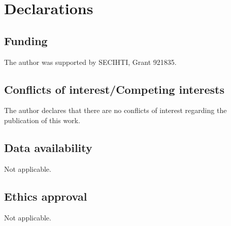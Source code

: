 \documentclass[preprint,12pt]{elsarticle}
\begin{document}






\section*{Declarations}

\subsection*{Funding}
The author was supported by SECIHTI, Grant 921835.

\subsection*{Conflicts of interest/Competing interests}
The author declares that there are no conflicts of interest regarding the publication of this work.
\subsection*{Data availability}
Not applicable.

\subsection*{Ethics approval}
Not applicable.

\end{document}
